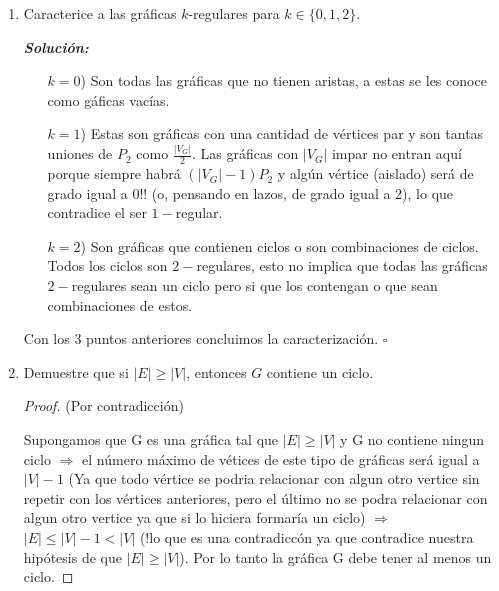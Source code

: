 \documentclass{article}
\begin{document}
\begin{enumerate}
\begin{proof}
      Por lo tanto, se sigue que si $a$ esta en $T_{1}$ entonces está en $T_{2}$.
  \end{proof}

\item Caracterice a las gr\'aficas $k$-regulares para $k \in \{ 0, 1, 2 \}$.

  \textit{\textbf{Soluci\'on:}}
  \begin{itemize}
  \item[$k = 0$)] Son todas las gráficas que no tienen aristas, a estas se les conoce
    como g\'aficas vac\'ias.
  \item[$k = 1$)] Estas son gr\'aficas con una cantidad de v\'ertices par y son tantas
    uniones de $P_2$ como $\frac{|V_G|}{2}$. Las gráficas con $|V_G|$ impar no entran
    aqu\'i porque siempre habr\'a $(|V_G| - 1) P_2$ y alg\'un v\'ertice (aislado) será
    de grado igual a $0$!! (o, pensando en lazos, de grado igual a 2), lo que contradice
    el ser $1-$regular.
  \item[$k = 2$)] Son gr\'aficas que contienen ciclos o son combinaciones de ciclos.
    Todos los ciclos son $2-$regulares, esto no implica que todas las gr\'aficas
    $2-$regulares sean un ciclo pero si que los contengan o que sean combinaciones
    de estos.
  \end{itemize}
  Con los $3$ puntos anteriores concluimos la caracterización. \hfill $\square$
\item Demuestre que si $|E| \ge |V|$, entonces $G$ contiene un ciclo.

\begin{proof} (Por contradicción)

  Supongamos que G es una gráfica tal que $|E|\geq|V|$ y G no contiene ningun ciclo $\Longrightarrow$ el número máximo de vétices de este tipo de gráficas será igual a $|V|-1$ (Ya que todo vértice se podria relacionar con algun otro vertice sin repetir con los vértices anteriores, pero el último no se podra relacionar con algun otro vertice ya que si lo hiciera formaría un ciclo) $\Longrightarrow$ $|E|\leq|V|-1 < |V|$ (!lo que es una contradiccón ya que contradice nuestra hipótesis de que $|E|\geq|V|$). Por lo tanto la gráfica G debe tener al menos un ciclo.

  \end{proof}
\end{enumerate}
\end{document}
